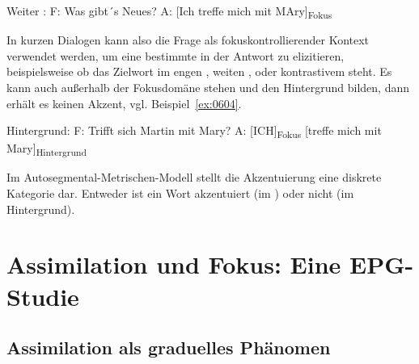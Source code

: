 \newpage 
\begin{exe}
	\ex Weiter :\label{ex:0603}
	\sn F: Was gibt´s Neues?
	\sn A: [Ich treffe mich mit MAry]\textsubscript{Fokus}
\end{exe}

In kurzen Dialogen kann also die Frage als fokuskontrollierender Kontext verwendet werden, um eine bestimmte  in der Antwort zu elizitieren, beispielsweise ob das Zielwort im engen , weiten , oder kontrastivem  steht. Es kann auch außerhalb der Fokusdomäne stehen und den Hintergrund bilden, dann erhält es keinen Akzent, vgl. Beispiel~\ref{ex:0604}.

\begin{exe} 
	\ex Hintergrund:\label{ex:0604}
	\sn F: Trifft sich Martin mit Mary?
	\sn A: [ICH]\textsubscript{Fokus} [treffe mich mit Mary]\textsubscript{Hintergrund}
\end{exe}

Im Autosegmental-Metrischen-Modell stellt die Akzentuierung eine diskrete Kategorie dar. Entweder ist ein Wort akzentuiert (im ) oder nicht (im Hintergrund). 

\section{Assimilation und Fokus: Eine EPG-Studie}
\label{sec:0602}

\subsection{Assimilation als graduelles Phänomen}
\label{subsec:060201}


